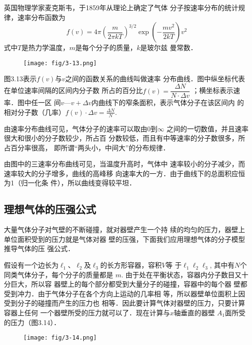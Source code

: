 英国物理学家麦克斯韦，于1859年从理论上确定了气体
分子按速率分布的统计规律，速率分布函数为
\[f(v)=4\pi\left(\frac{m}{2\pi kT}\right)^{3/2}\exp\left(-\frac{mv^2}{2kT}\right)v^2\]
式中$T$是热力学温度，$m$是每个分子的质量，$k$是玻尔兹
曼常数．
\begin{figure}[htp]
    \centering
\texttt{[image: fig/3-13.png]}
    \caption{}
\end{figure}


图3.13表示$f(v)$与$v$之间的函数关系的曲线叫做速率
分布曲线．图中纵坐标代表在单位速率间隔的区间内分子数
所占的百分比$f(v)=\dfrac{\Delta N}{N\cdot \Delta v}$
；横坐标表示速率．图中任一区
间$v$—$v+\Delta v$内曲线下的窄条面积，表示气体分子在该区间内
的相对分子数（几率）$f(v)\cdot \Delta v=\frac{\Delta N}{N}$.

由速率分布曲线可见，气体分子的速率可以取由0到$\infty$
之间的一切数值，并且速率很大和很小的分子数较少，所占百
分数较低，而且有中等速率的分子数很多，所占百分率很高，
即所谓“两头小，中间大”的分布规律．

由图中的三速率分布曲线可见，当温度升高时，气体中
速率较小的分子减少，而速率较大的分子增多，曲线的高峰移
向速率大的一方．由于曲线下的总面积应恒为1（归一化条
件），所以曲线变得较平坦．

\subsection{理想气体的压强公式}
大量气体分子对气壁的不断碰撞，就对器壁产生一个持
续的均匀的压力，器壁上单位面积受到的压力就是气体对器
壁的压强，下面我们应用理想气体的分子模型推导气体的压
强公式．

假设有一个边长为$\ell_1$、$\ell_2$及$\ell_3$的长方形容器，容积$V$等
于$\ell_1\ell_2\ell_3$, 其中有$N$个同类气体分子，每个分子的质量都是
$m$. 由于处在平衡状态，容器内分子数目又十分巨大，所以容
器壁上的每个部分都受到大量分子的碰撞，容器中的每个器
壁都受到冲力．由于气体分子在各个方向上运动的几率相
等，所以器壁单位面积上因受到分子的碰撞而产生的压力也
相等．因此要计算气体对器壁的压力，只要计算容器上任何
一个器壁所受的压力就可以了．现在计算与$x$轴垂直的器壁
$A_1$面所受的压力（图3.14）．
\begin{figure}[htp]
    \centering
\texttt{[image: fig/3-14.png]}
    \caption{}
\end{figure}

